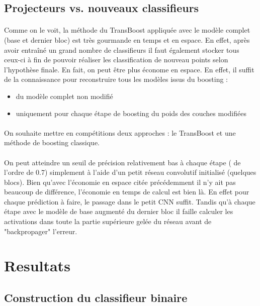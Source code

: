 \documentclass[11 pt]{article}
\begin{document}
\subsection{Projecteurs vs. nouveaux classifieurs}
\paragraph{}Comme on le voit, la méthode du TransBoost appliquée avec le modèle complet (base et dernier bloc) est très gourmande en temps et en espace. En effet, après avoir entraîné un grand nombre de classifieurs il faut également stocker tous ceux-ci à fin de pouvoir réaliser les classification de nouveau points selon l’hypothèse finale. En fait, on peut être plus économe en espace. En effet, il suffit de la connaissance pour reconstruire tous les modèles issus du boosting :\\ \medskip
\begin{itemize}
  \item du modèle complet non modifié
  \item uniquement pour chaque étape de boosting du poids des couches modifiées
\end{itemize}
\paragraph{}On souhaite mettre en compétitions deux approches : le TransBoost et une méthode de boosting classique.

\paragraph{}On peut atteindre un seuil de précision relativement bas à chaque étape ( de l’ordre de 0.7) simplement à l’aide d’un petit réseau convolutif initialisé (quelques blocs). Bien qu’avec l’économie en espace citée précédemment il n’y ait pas beaucoup de différence, l’économie en temps de calcul est bien là. En effet pour chaque prédiction à faire, le passage dans le petit CNN suffit. Tandis qu’à chaque étape avec le modèle de base augmenté du dernier bloc il faille calculer les activations dans toute la partie supérieure gelée du réseau avant de "backpropager" l’erreur.



\section{Resultats}
\subsection{Construction du classifieur binaire}
\end{document}
